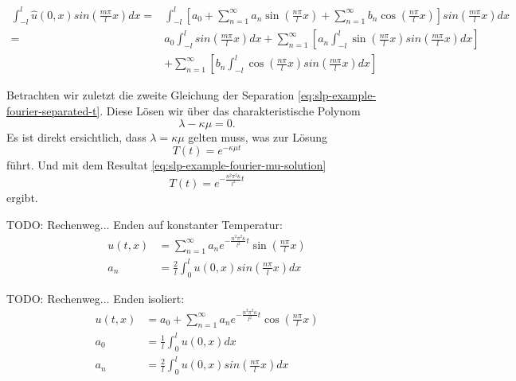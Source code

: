 \[
\begin{aligned}
    \int_{-l}^{l}\hat{u}(0, x)sin\left(\frac{m \pi}{l}x\right)dx
    =&
    \int_{-l}^{l} \left[a_0
    +
    \sum_{n = 1}^{\infty} a_n\sin\left(\frac{n\pi}{l}x\right)
    +
    \sum_{n = 1}^{\infty} b_n\cos\left(\frac{n\pi}{l}x\right)\right]
    sin\left(\frac{m \pi}{l}x\right) dx
    \\
    =&
    a_0 \int_{-l}^{l}sin\left(\frac{m \pi}{l}x\right) dx
    +
    \sum_{n = 1}^{\infty}\left[a_n\int_{-l}^{l}\sin\left(\frac{n\pi}{l}x\right)
        sin\left(\frac{m \pi}{l}x\right)dx\right]
    \\
    &+
    \sum_{n = 1}^{\infty}\left[b_n\int_{-l}^{l} \cos\left(\frac{n\pi}{l}x\right)
        sin\left(\frac{m \pi}{l}x\right)dx\right]
\end{aligned}
\]

Betrachten wir zuletzt die zweite Gleichung der Separation
\eqref{eq:slp-example-fourier-separated-t}.
Diese Lösen wir über das charakteristische Polynom
\[
    \lambda - \kappa \mu
    =
    0.
\]
Es ist direkt ersichtlich, dass $\lambda = \kappa \mu$ gelten muss, was zur
Lösung
\[
    T(t)
    =
    e^{-\kappa \mu t}
\]
führt.
Und mit dem Resultat \eqref{eq:slp-example-fourier-mu-solution}
\[
    T(t)
    =
    e^{-\frac{n^{2}\pi^{2}\kappa}{l^{2}}t}
\]
ergibt.

TODO: Rechenweg... Enden auf konstanter Temperatur:
\[
\begin{aligned}
    u(t,x)
    &=
    \sum_{n=1}^{\infty}a_{n}e^{-\frac{n^{2}\pi^{2}\kappa}{l^{2}}t}
    \sin\left(\frac{n\pi}{l}x\right)
    \\
    a_{n}
    &=
    \frac{2}{l}\int_{0}^{l}u(0,x)sin\left(\frac{n\pi}{l}x\right) dx
\end{aligned}
\]

TODO: Rechenweg... Enden isoliert:
\[
\begin{aligned}
    u(t,x)
    &=
    a_{0} + \sum_{n=1}^{\infty}a_{n}e^{-\frac{n^{2}\pi^{2}\kappa}{l^{2}}t}
    \cos\left(\frac{n\pi}{l}x\right)
    \\
    a_{0}
    &=
    \frac{1}{l}\int_{0}^{l}u(0,x) dx
    \\
    a_{n}
    &=
    \frac{2}{l}\int_{0}^{l}u(0,x)sin\left(\frac{n\pi}{l}x\right) dx
\end{aligned}
\]
